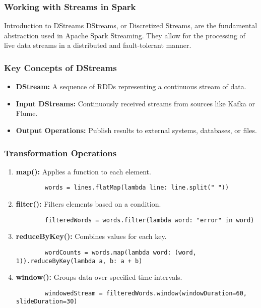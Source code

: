 \documentclass[aspectratio=169]{beamer}
\begin{document}
\begin{frame}
    \frametitle{Working with Streams in Spark}
    \begin{block}{Introduction to DStreams}
        DStreams, or Discretized Streams, are the fundamental abstraction used in Apache Spark Streaming. They allow for the processing of live data streams in a distributed and fault-tolerant manner.
    \end{block}
\end{frame}

\begin{frame}
    \frametitle{Key Concepts of DStreams}
    \begin{itemize}
        \item \textbf{DStream:} A sequence of RDDs representing a continuous stream of data.
        \item \textbf{Input DStreams:} Continuously received streams from sources like Kafka or Flume.
        \item \textbf{Output Operations:} Publish results to external systems, databases, or files.
    \end{itemize}
\end{frame}

\begin{frame}[fragile]
    \frametitle{Transformation Operations}
    \begin{enumerate}
        \item \textbf{map():} Applies a function to each element.
        \begin{lstlisting}
        words = lines.flatMap(lambda line: line.split(" "))
        \end{lstlisting}

        \item \textbf{filter():} Filters elements based on a condition.
        \begin{lstlisting}
        filteredWords = words.filter(lambda word: "error" in word)
        \end{lstlisting}

        \item \textbf{reduceByKey():} Combines values for each key.
        \begin{lstlisting}
        wordCounts = words.map(lambda word: (word, 1)).reduceByKey(lambda a, b: a + b)
        \end{lstlisting}

        \item \textbf{window():} Groups data over specified time intervals.
        \begin{lstlisting}
        windowedStream = filteredWords.window(windowDuration=60, slideDuration=30)
        \end{lstlisting}
    \end{enumerate}
\end{frame}
\end{document}

